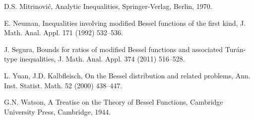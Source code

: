 \documentclass[10pt]{amsart}
\begin{document}
\begin{thebibliography}{}
 {D.S. Mitrinovi\'c,} Analytic
Inequalities, Springer-Verlag, Berlin, 1970.

 E. Neuman, Inequalities involving modified Bessel
functions of the first kind, J. Math. Anal. Appl. 171 (1992) 532--536.

 J. Segura, Bounds for ratios of modified Bessel functions and associated Tur\'an-type
inequalities, J. Math. Anal. Appl. 374 (2011) 516--528.

 L. Yuan, J.D. Kalbfleisch, On the Bessel distribution and related problems, Ann. Inst. Statist. Math. 52 (2000) 438--447.

 G.N. Watson, A Treatise on the Theory of Bessel
Functions, Cambridge University Press, Cambridge, 1944.

\end{thebibliography}
\end{document}
